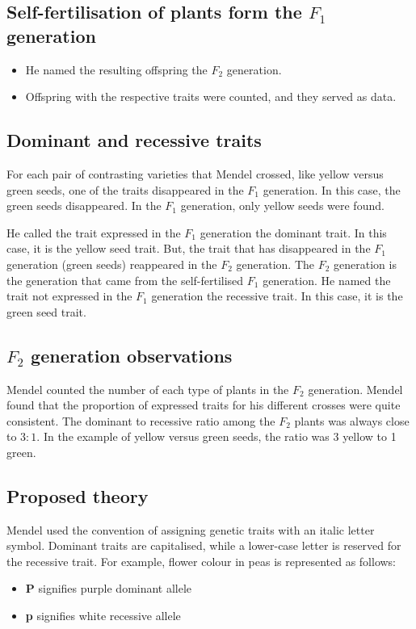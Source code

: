 \documentclass[11pt]{article}
\begin{document}
\subsection{Self-fertilisation of plants form the \(F_1\) generation}
\label{sec:org85d790d}
\begin{itemize}
\item He named the resulting offspring the \(F_2\) generation.
\item Offspring with the respective traits were counted, and they served as data.
\end{itemize}
\subsection{Dominant and recessive traits}
\label{sec:orgdb8b5ac}
For each pair of contrasting varieties that Mendel crossed, like yellow versus green seeds, one of the traits disappeared in the \(F_1\) generation. In this case, the green seeds disappeared. In the \(F_1\) generation, only yellow seeds were found.


He called the trait expressed in the \(F_1\) generation the dominant trait. In this case, it is the yellow seed trait. But, the trait that has disappeared in the \(F_1\) generation (green seeds) reappeared in the \(F_2\) generation. The \(F_2\) generation is the generation that came from the self-fertilised \(F_1\) generation. He named the trait not expressed in the \(F_1\) generation the recessive trait. In this case, it is the green seed trait.

\newpage
\subsection{\(F_2\) generation observations}
\label{sec:orgdd8c0d9}
Mendel counted the number of each type of plants in the \(F_2\) generation. Mendel found that the proportion of expressed traits for his different crosses were quite consistent. The dominant to recessive ratio among the \(F_2\) plants was always close to \(3:1\). In the example of yellow versus green seeds, the ratio was 3 yellow to 1 green.
\subsection{Proposed theory}
\label{sec:org86de100}
Mendel used the convention of assigning genetic traits with an italic letter symbol. Dominant traits are capitalised, while a lower-case letter is reserved for the recessive trait. For example, flower colour in peas is represented as follows:
\begin{itemize}
\item \textbf{P} signifies purple dominant allele
\item \textbf{p} signifies white recessive allele
\end{itemize}
\end{document}
